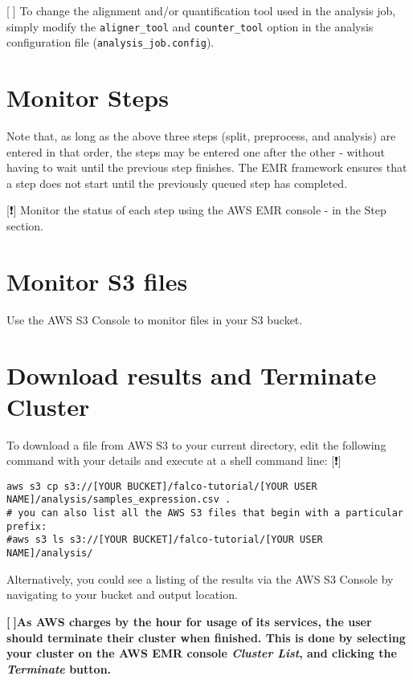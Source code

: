 \documentclass[]{book}
\begin{document}
{[}🔴{]} To change the alignment and/or quantification tool used in the analysis job, simply modify the \texttt{aligner\_tool} and \texttt{counter\_tool} option in the analysis configuration file (\texttt{analysis\_job.config}).

\hypertarget{monitor-steps}{%
\section{Monitor Steps}\label{monitor-steps}}

Note that, as long as the above three steps (split, preprocess, and analysis) are entered in that order, the steps may be entered one after the other - without having to wait until the previous step finishes. The EMR framework ensures that a step does not start until the previously queued step has completed.

{[}❗️{]} Monitor the status of each step using the AWS EMR console - in the Step section.

\hypertarget{monitor-s3-files}{%
\section{Monitor S3 files}\label{monitor-s3-files}}

Use the AWS S3 Console to monitor files in your S3 bucket.

\hypertarget{download-results-and-terminate-cluster}{%
\section{Download results and Terminate Cluster}\label{download-results-and-terminate-cluster}}

To download a file from AWS S3 to your current directory, edit the following command with your details and execute at a shell command line: {[}❗️{]}

\begin{verbatim}
aws s3 cp s3://[YOUR BUCKET]/falco-tutorial/[YOUR USER NAME]/analysis/samples_expression.csv .
# you can also list all the AWS S3 files that begin with a particular prefix:
#aws s3 ls s3://[YOUR BUCKET]/falco-tutorial/[YOUR USER NAME]/analysis/
\end{verbatim}

Alternatively, you could see a listing of the results via the AWS S3 Console by navigating to your bucket and output location.

\textbf{{[}🔴{]}As AWS charges by the hour for usage of its services, the user should terminate their cluster when finished. This is done by selecting your cluster on the AWS EMR console \emph{Cluster List}, and clicking the \emph{Terminate} button.}


\end{document}
